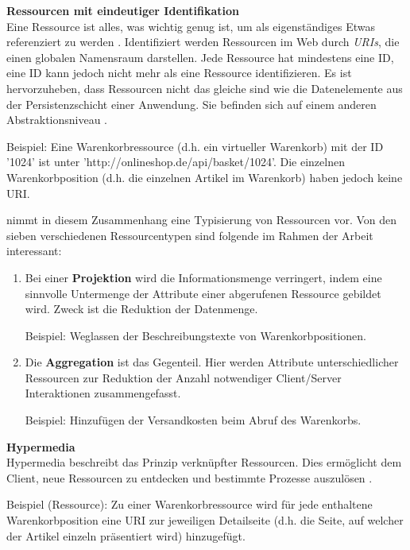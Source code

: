 \documentclass[11pt, a4paper, titlepage, listof=totoc, bibliography=totoc, index=totoc, twoside, openright, headings=normal]{scrreprt}
\begin{document}
\textbf{Ressourcen mit eindeutiger Identifikation}\\
\glqq Eine Ressource ist alles, was wichtig genug ist, um als eigenständiges Etwas referenziert zu werden\grqq{} \citep{richardson07}. Identifiziert werden Ressourcen im Web durch \emph{\ac{URI}s}, die einen globalen Namensraum darstellen. Jede Ressource hat mindestens eine ID, eine ID kann jedoch nicht mehr als eine Ressource identifizieren. Es ist hervorzuheben, dass Ressourcen nicht das gleiche sind wie die Datenelemente aus der Persistenzschicht einer Anwendung. Sie befinden sich auf einem anderen Abstraktionsniveau \citep{tilkov11}.\vspace{0.3em}

Beispiel: Eine Warenkorbressource (d.h. ein virtueller Warenkorb) mit der ID '1024' ist unter 'http://onlineshop.de/api/basket/1024'. Die einzelnen Warenkorbposition (d.h. die einzelnen Artikel im Warenkorb) haben jedoch keine URI.

\citet{tilkov11} nimmt in diesem Zusammenhang eine Typisierung von Ressourcen vor. Von den sieben verschiedenen Ressourcentypen sind folgende im Rahmen der Arbeit interessant:
\begin{enumerate}
\item Bei einer \textbf{Projektion} wird die Informationsmenge verringert, indem eine sinnvolle Untermenge der Attribute einer abgerufenen Ressource gebildet wird. Zweck ist die Reduktion der Datenmenge.\vspace{0.2em}

Beispiel: Weglassen der Beschreibungstexte von Warenkorbpositionen.
\item Die \textbf{Aggregation} ist das Gegenteil. Hier werden Attribute unterschiedlicher Ressourcen zur Reduktion der Anzahl notwendiger Client/Server Interaktionen zusammengefasst.\vspace{0.2em}

Beispiel: Hinzufügen der Versandkosten beim Abruf des Warenkorbs.
\end{enumerate}
\textbf{Hypermedia}\\
Hypermedia beschreibt das Prinzip verknüpfter Ressourcen. Dies ermöglicht dem Client, neue Ressourcen zu entdecken und bestimmte Prozesse auszulösen \citep{wilde11}.

Beispiel (Ressource): Zu einer Warenkorbressource wird für jede enthaltene Warenkorbposition eine URI zur jeweiligen Detailseite (d.h. die Seite, auf welcher der Artikel einzeln präsentiert wird) hinzugefügt.
\end{document}
